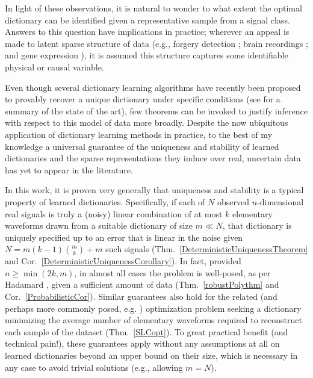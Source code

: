In light of these observations, it is natural to wonder to what extent the optimal dictionary can be identified given a representative sample from a signal class. Answers to this question have implications in practice; wherever an appeal is made to latent sparse structure of data (e.g., forgery detection \cite{hughes2010, olshausen2010applied}; brain recordings \cite{jung2001imaging, agarwal2014spatially, lee2016sparse}; and gene expression \cite{wu2016stability}), it is assumed this structure captures some identifiable physical or causal variable. 

Even though several dictionary learning algorithms have recently been proposed to provably recover a unique dictionary under specific conditions (see \cite[Sec.~I-E]{Sun16} for a summary of the state of the art), few theorems can be invoked to justify inference with respect to this model of data more broadly. Despite the now ubiquitous application of dictionary learning methods in practice, to the best of my knowledge a universal guarantee of the uniqueness and stability of learned dictionaries and the sparse representations they induce over real, uncertain data has yet to appear in the literature. 

In this work, it is proven very generally that uniqueness and stability is a typical property of learned dictionaries. 
Specifically, if each of $N$ observed $n$-dimensional real signals is truly a (noisy) linear combination of at most $k$ elementary waveforms drawn from a suitable dictionary of size $m \ll N$, that dictionary is uniquely specified up to an error that is linear in the noise given \mbox{$N = m(k-1){m \choose k} + m$} such signals (Thm.~\ref{DeterministicUniquenessTheorem} and Cor.~\ref{DeterministicUniquenessCorollary}). In fact, provided $n \geq \min(2k,m)$, in almost all cases the problem is well-posed, as per Hadamard \cite{Hadamard1902}, given a sufficient amount of data (Thm.~\ref{robustPolythm} and Cor.~\ref{ProbabilisticCor}). 
Similar guarantees also hold for the related (and perhaps more commonly posed, e.g. \cite{rehnsommer2007}) optimization problem seeking a dictionary minimizing the average number of elementary waveforms required to reconstruct each sample of the dataset (Thm.~\ref{SLCopt}). To great practical benefit (and technical pain!), these guarantees apply without any assumptions at all on learned dictionaries beyond an upper bound on their size, which is necessary in any case to avoid trivial solutions (e.g., allowing $m = N$). %

